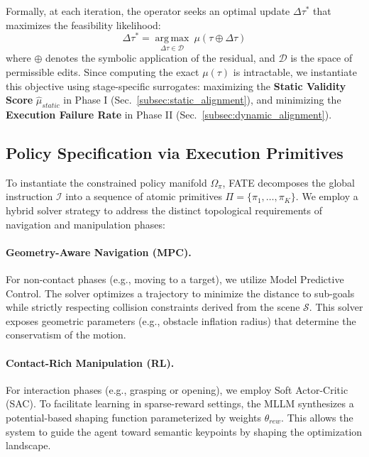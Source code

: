 \documentclass{article}
\theoremstyle{plain}
\theoremstyle{definition}
\theoremstyle{remark}
\begin{document}
Formally, at each iteration, the operator seeks an optimal update $\Delta\tau^*$ that maximizes the feasibility likelihood:
\begin{equation}
    \Delta\tau^* = \operatorname*{arg\,max}_{\Delta\tau \in \mathcal{D}} \ \mu(\tau \oplus \Delta\tau)
\end{equation}
where $\oplus$ denotes the symbolic application of the residual, and $\mathcal{D}$ is the space of permissible edits. Since computing the exact $\mu(\tau)$ is intractable, we instantiate this objective using stage-specific surrogates: maximizing the \textbf{Static Validity Score} $\hat{\mu}_{static}$ in Phase I (Sec.~\ref{subsec:static_alignment}), and minimizing the \textbf{Execution Failure Rate} in Phase II (Sec.~\ref{subsec:dynamic_alignment}).

\subsection{Policy Specification via Execution Primitives}
\label{subsec:policy_specification}

To instantiate the constrained policy manifold $\Omega_\pi$, FATE decomposes the global instruction $\mathcal{I}$ into a sequence of atomic primitives $\Pi = \{ \pi_1, \dots, \pi_K \}$. We employ a hybrid solver strategy to address the distinct topological requirements of navigation and manipulation phases:

\paragraph{Geometry-Aware Navigation (MPC).}
For non-contact phases (e.g., moving to a target), we utilize Model Predictive Control. The solver optimizes a trajectory to minimize the distance to sub-goals while strictly respecting collision constraints derived from the scene $\mathcal{S}$. This solver exposes geometric parameters (e.g., obstacle inflation radius) that determine the conservatism of the motion.

\paragraph{Contact-Rich Manipulation (RL).}
For interaction phases (e.g., grasping or opening), we employ Soft Actor-Critic (SAC). To facilitate learning in sparse-reward settings, the MLLM synthesizes a potential-based shaping function parameterized by weights $\theta_{rew}$. This allows the system to guide the agent toward semantic keypoints by shaping the optimization landscape.
\end{document}
